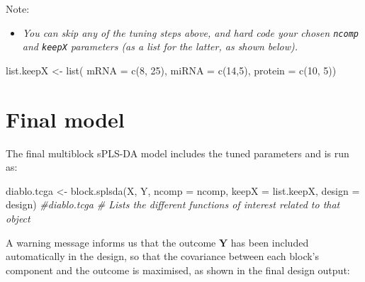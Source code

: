 \documentclass[
]{book}
\newenvironment{Shaded}{\begin{snugshade}}{\end{snugshade}}
\newcommand{\AttributeTok}[1]{\textcolor[rgb]{0.77,0.63,0.00}{#1}}
\newcommand{\CommentTok}[1]{\textcolor[rgb]{0.56,0.35,0.01}{\textit{#1}}}
\newcommand{\DecValTok}[1]{\textcolor[rgb]{0.00,0.00,0.81}{#1}}
\newcommand{\FunctionTok}[1]{\textcolor[rgb]{0.00,0.00,0.00}{#1}}
\newcommand{\NormalTok}[1]{#1}
\newcommand{\OtherTok}[1]{\textcolor[rgb]{0.56,0.35,0.01}{#1}}
\newcommand{\SpecialCharTok}[1]{\textcolor[rgb]{0.00,0.00,0.00}{#1}}
\providecommand{\tightlist}{%
  \setlength{\itemsep}{0pt}\setlength{\parskip}{0pt}}
\begin{document}
Note:

\begin{itemize}
\tightlist
\item
  \emph{You can skip any of the tuning steps above, and hard code your chosen \texttt{ncomp} and \texttt{keepX} parameters (as a list for the latter, as shown below).}
\end{itemize}

\begin{Shaded}
\begin{Highlighting}[]
\NormalTok{list.keepX }\OtherTok{\textless{}{-}} \FunctionTok{list}\NormalTok{( }\AttributeTok{mRNA =} \FunctionTok{c}\NormalTok{(}\DecValTok{8}\NormalTok{, }\DecValTok{25}\NormalTok{), }\AttributeTok{miRNA =} \FunctionTok{c}\NormalTok{(}\DecValTok{14}\NormalTok{,}\DecValTok{5}\NormalTok{), }\AttributeTok{protein =} \FunctionTok{c}\NormalTok{(}\DecValTok{10}\NormalTok{, }\DecValTok{5}\NormalTok{))}
\end{Highlighting}
\end{Shaded}

\hypertarget{final-model}{%
\section{Final model}\label{final-model}}

The final multiblock sPLS-DA model includes the tuned parameters and is run as:

\begin{Shaded}
\begin{Highlighting}[]
\NormalTok{diablo.tcga }\OtherTok{\textless{}{-}} \FunctionTok{block.splsda}\NormalTok{(X, Y, }\AttributeTok{ncomp =}\NormalTok{ ncomp, }
                            \AttributeTok{keepX =}\NormalTok{ list.keepX, }\AttributeTok{design =}\NormalTok{ design)}
\CommentTok{\#diablo.tcga   \# Lists the different functions of interest related to that object}
\end{Highlighting}
\end{Shaded}

A warning message informs us that the outcome \(\boldsymbol Y\) has been included automatically in the design, so that the covariance between each block's component and the outcome is maximised, as shown in the final design output:

\begin{Shaded}
\end{Shaded}
\end{document}
